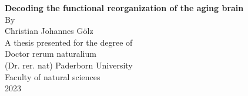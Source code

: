 \begin{titlepage}
    \begin{center}
        \vspace*{1cm}
        \LARGE
        \textbf{Decoding the functional reorganization of the aging brain}\\
        \vspace{1.5cm}
        \Large
        By\\
        \vspace{0.5cm}
        Christian Johannes Gölz\\
        \vspace{0.5cm}       
        A thesis presented for the degree of\\
        Doctor rerum naturalium\\
        (Dr. rer. nat)
        \vfill
        \Large
        Paderborn University\\
        Faculty of natural sciences\\
        2023
            
    \end{center}
\end{titlepage}

